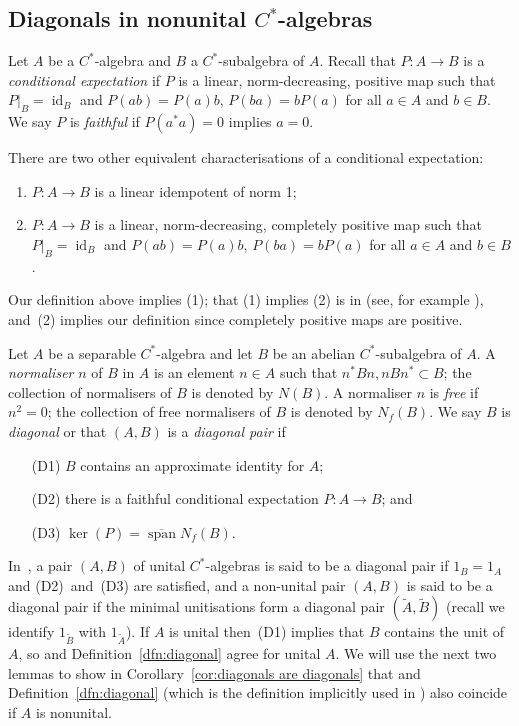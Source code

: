 \documentclass[12pt,a4paper]{amsart}
\newcommand{\lsp}{\operatorname{span}}
\newcommand{\clsp}{\overline{\lsp}}
\newcommand{\id}{\operatorname{id}}
\begin{document}
\subsection{Diagonals in nonunital \texorpdfstring{$C^*$}{C*}-algebras}

Let $A$ be a $C^*$-algebra and $B$ a $C^*$-subalgebra of $A$.
Recall that $P:A\to B$ is a \emph{conditional expectation} if
$P$ is a linear, norm-decreasing, positive map such that
$P|_B=\id_B$ and $P(ab)=P(a)b$, $P(ba)=bP(a)$ for all $a\in A$
and $b\in B$. We say $P$ is \emph{faithful} if $P(a^*a)=0$
implies $a=0$.

\begin{remark}\label{rem-cond-exp}
There are two other equivalent characterisations of a
conditional expectation:
\begin{enumerate}
\item $P:A\to B$ is a linear idempotent of norm 1;
\item $P:A\to B$ is a linear, norm-decreasing, completely
    positive map such that $P|_B=\id_B$ and $P(ab)=P(a)b$,
    $P(ba)=bP(a)$ for all $a\in A$ and $b\in B$.
\end{enumerate}
Our definition above implies (1); that (1) implies (2) is in \cite{tom} (see,  for example
\cite[Theorem~II.6.10.2]{bruce}),
and~(2) implies our definition since completely positive maps
are positive.
\end{remark}


\begin{defn}\label{dfn:diagonal}
Let $A$ be a separable $C^*$-algebra and let $B$ be an abelian
$C^*$-subalgebra of $A$. A \emph{normaliser} $n$ of $B$ in $A$
is an element $n\in A$ such that $n^* B n,  n B n^* \subset B$;
the collection of normalisers of $B$ is denoted by $N(B)$. A
normaliser $n$  is \emph{free} if $n^2 = 0$; the collection of
free normalisers of $B$ is denoted by $N_f(B)$. We  say  $B$ is
\emph{diagonal} or that $(A,B)$ is a \emph{diagonal pair} if
\begin{itemize}
\item[(D1)] $B$ contains an approximate identity for $A$;
\item[(D2)] there is a faithful conditional expectation $P
    : A \to B$; and
\item[(D3)] $\ker(P) = \clsp N_f(B)$.
\end{itemize}
\end{defn}
In~\cite[Definition~1.1]{Kumjian1986}, a pair $(A,B)$ of unital
$C^*$-algebras is said to be a diagonal pair if $1_B = 1_A$ and
(D2)~and~(D3) are satisfied, and a non-unital pair $(A,B)$ is
said to be a diagonal pair if the minimal unitisations form a
diagonal pair $(\widetilde{A}, \widetilde{B})$ (recall we
identify $1_{\widetilde{B}}$ with $1_{\widetilde{A}}$). If $A$
is unital then~(D1) implies that $B$ contains the unit of $A$,
so \cite[Definition~1.1]{Kumjian1986} and
Definition~\ref{dfn:diagonal} agree for unital $A$. We will use
the next two lemmas to show in Corollary~\ref{cor:diagonals are
diagonals}  that \cite[Definition~1.1]{Kumjian1986} and
Definition~\ref{dfn:diagonal} (which is the definition
implicitly used in \cite{Kumjian1985}) also coincide if $A$ is
nonunital.
\end{document}
